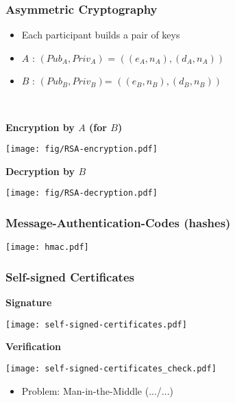 \documentclass[
hyperref={pdfpagelabels=false}
,xcolor=table
]
{beamer}
\begin{document}
\begin{frame}
  \frametitle{Asymmetric Cryptography}

  \begin{itemize}
  \item Each participant builds a pair of keys
  \item $A$ : $(Pub_A, Priv_A)$ = $((e_A,n_A), (d_A, n_A))$
  \item $B$ : $(Pub_B, Priv_B)$= $((e_B,n_B), (d_B, n_B))$
  \end{itemize}

  \
  
  \textbf{Encryption by $A$ (for $B$)}
  
  \begin{center}
    \texttt{[image: fig/RSA-encryption.pdf]}
  \end{center}
  
  \vfill
  
  
  \textbf{Decryption by $B$}
  
   \begin{center}
     \texttt{[image: fig/RSA-decryption.pdf]}
   \end{center}
\end{frame}


\begin{frame}
  \frametitle{Message-Authentication-Codes (hashes)}

  \begin{center}
    \texttt{[image: hmac.pdf]}
  \end{center}
\end{frame}


\begin{frame}
  \frametitle{Self-signed Certificates}

  \begin{minipage}[t]{.45\linewidth}
    \textbf{Signature}

    \bigskip
    
    
    \texttt{[image: self-signed-certificates.pdf]}        
  \end{minipage}
  \hfill
  \begin{minipage}[t]{.45\linewidth}
    \textbf{Verification}

    \bigskip
    
    \texttt{[image: self-signed-certificates\_check.pdf]}    
  \end{minipage}

  \vfill

  
  \begin{itemize}
  \item Problem: Man-in-the-Middle (.../...)
  \end{itemize}
  
\end{frame}
\end{document}
